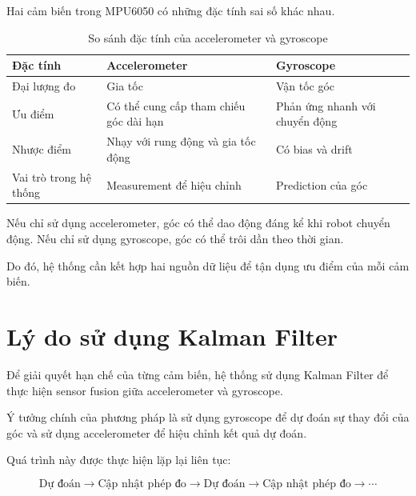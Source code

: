 \documentclass[a4paper,12pt]{report}
\begin{document}
Hai cảm biến trong MPU6050 có những đặc tính sai số khác nhau.

\begin{table}[H]
    \centering
    \label{tab:sensor-comparison}
    \begin{tabular}{p{4cm} p{5cm} p{5cm}}
        \toprule
        \textbf{Đặc tính}
        & \textbf{Accelerometer}
        & \textbf{Gyroscope} \\
        \midrule
        Đại lượng đo
        & Gia tốc
        & Vận tốc góc \\

        Ưu điểm
        & Có thể cung cấp tham chiếu góc dài hạn
        & Phản ứng nhanh với chuyển động \\

        Nhược điểm
        & Nhạy với rung động và gia tốc động
        & Có bias và drift \\

        Vai trò trong hệ thống
        & Measurement để hiệu chỉnh
        & Prediction của góc \\
        \bottomrule
    \end{tabular}
    \caption{So sánh đặc tính của accelerometer và gyroscope}
\end{table}

Nếu chỉ sử dụng accelerometer, góc có thể dao động đáng kể khi robot chuyển động. Nếu chỉ sử dụng gyroscope, góc có thể trôi dần theo thời gian.

Do đó, hệ thống cần kết hợp hai nguồn dữ liệu để tận dụng ưu điểm của mỗi cảm biến.



\section{Lý do sử dụng Kalman Filter}
\label{sec:why-kalman}

Để giải quyết hạn chế của từng cảm biến, hệ thống sử dụng Kalman Filter để thực hiện sensor fusion giữa accelerometer và gyroscope.

Ý tưởng chính của phương pháp là sử dụng gyroscope để dự đoán sự thay đổi của góc và sử dụng accelerometer để hiệu chỉnh kết quả dự đoán.

Quá trình này được thực hiện lặp lại liên tục:

\[
\boxed{
\text{Dự đoán}
\rightarrow
\text{Cập nhật phép đo}
\rightarrow
\text{Dự đoán}
\rightarrow
\text{Cập nhật phép đo}
\rightarrow \cdots
}
\tag{1.22}
\]
\end{document}
